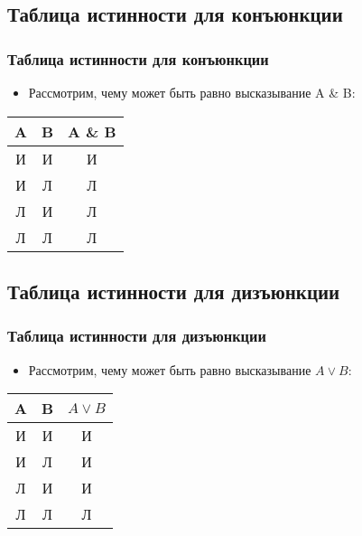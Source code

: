 \documentclass[compress,red]{beamer}
\begin{document}
\subsection{Таблица истинности для конъюнкции}
\begin{frame}[fragile]
  \frametitle{Таблица истинности для конъюнкции}
  \begin{itemize}
    \item Рассмотрим, чему может быть равно высказывание A \& B:
  \end{itemize}
  \begin{center}
    \begin{tabular}{|c|c|c|}
      \hline
      A & B & A \& B \\
      \hline
      И & И & И \\
      \hline
      И & Л & Л \\
      \hline
      Л & И & Л \\
      \hline
      Л & Л & Л \\
      \hline
    \end{tabular}
  \end{center}
\end{frame}

\subsection{Таблица истинности для дизъюнкции}
\begin{frame}[fragile]
  \frametitle{Таблица истинности для дизъюнкции}
  \begin{itemize}
    \item Рассмотрим, чему может быть равно высказывание $A \vee B$:
  \end{itemize}
  \begin{center}
    \begin{tabular}{|c|c|c|}
      \hline
      A & B & $A \vee B$ \\
      \hline
      И & И & И \\
      \hline
      И & Л & И \\
      \hline
      Л & И & И \\
      \hline
      Л & Л & Л \\
      \hline
    \end{tabular}
  \end{center}
\end{frame}
\end{document}
